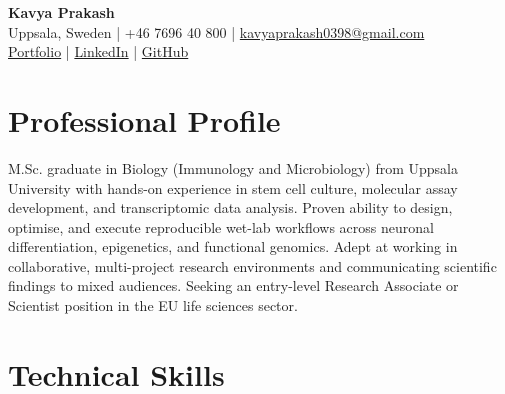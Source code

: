 \documentclass[10pt, a4paper]{article}
\begin{document}

\begin{center}
  {\LARGE\bfseries Kavya Prakash}\\[4pt]
  Uppsala, Sweden \quad|\quad
  +46 7696 40 800 \quad|\quad
  \href{mailto:kavyaprakash0398@gmail.com}{kavyaprakash0398@gmail.com}\\[2pt]
  \href{https://kavyaprakash.me}{Portfolio}
  \quad|\quad
  \href{https://www.linkedin.com/in/kavya-prakash-vks/}{LinkedIn}
  \quad|\quad
  \href{https://github.com/kavyaprakash-vks}{GitHub}
\end{center}

\vspace{2pt}

\section{Professional Profile}

M.Sc. graduate in Biology (Immunology and Microbiology) from Uppsala University with hands-on
experience in stem cell culture, molecular assay development, and transcriptomic data analysis.
Proven ability to design, optimise, and execute reproducible wet-lab workflows across neuronal
differentiation, epigenetics, and functional genomics. Adept at working in collaborative,
multi-project research environments and communicating scientific findings to mixed audiences.
Seeking an entry-level Research Associate or Scientist position in the EU life sciences sector.

\vspace{2pt}

\section{Technical Skills}
\end{document}
